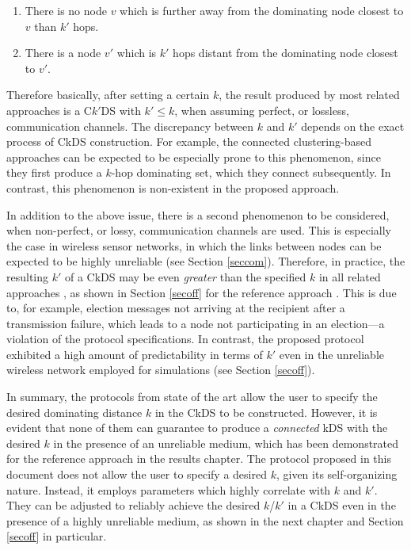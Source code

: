 \begin{enumerate}

\item There is no node $v$ which is further away from the dominating node closest to $v$ than $k'$ hops.

\item There is a node $v'$ which is $k'$ hops distant from the dominating node closest to $v'$. 

\end{enumerate}

 Therefore basically, after setting a certain $k$, the result produced by most related approaches is a C$k'$DS with $k'\leq k$, when assuming perfect, or lossless, communication channels. The discrepancy between $k$ and $k'$ depends on the exact process of CkDS construction. For example, the connected clustering-based approaches \cite{theoleyreV04structure, theoleyreV05stabilization, yangWC05clustering} can be expected to be especially prone to this phenomenon, since they first produce a $k$-hop dominating set, which they connect subsequently. In contrast, this phenomenon is non-existent in the proposed approach.
 

In addition to the above issue, there is a second phenomenon to be considered, when non-perfect, or lossy, communication channels are used. This is especially the case in wireless sensor networks, in which the links between nodes can be expected to be highly unreliable (see Section \ref{seccom}). Therefore, in practice, the resulting $k'$ of a CkDS may be even \emph{greater} than the specified $k$ in all related approaches \cite{sausenSLP07backbones, theoleyreV04structure, theoleyreV05stabilization, yangLT08algorithm, yangWC05clustering}, as shown in Section \ref{secoff} for the reference approach \cite{sausenSLP07backbones}. This is due to, for example, election messages not arriving at the recipient after a transmission failure, which leads to a node not participating in an election---a violation of the protocol specifications. In contrast, the proposed protocol exhibited a high amount of predictability in terms of $k'$ even in the unreliable wireless network employed for simulations (see Section \ref{secoff}).

In summary, the protocols from state of the art \cite{sausenSLP07backbones, theoleyreV04structure, theoleyreV05stabilization, yangLT08algorithm, yangWC05clustering} allow the user to specify the desired dominating distance $k$ in the CkDS to be constructed. However, it is evident that none of them can guarantee to produce a \emph{connected} kDS with the desired $k$ in the presence of an unreliable medium, which has been demonstrated for the reference approach \cite{sausenSLP07backbones} in the results chapter. The protocol proposed in this document does not allow the user to specify a desired $k$, given its self-organizing nature. Instead, it employs parameters which highly correlate with $k$ and $k'$. They can be adjusted to reliably achieve the desired $k$/$k'$ in a CkDS even in the presence of a highly unreliable medium, as shown in the next chapter and Section \ref{secoff} in particular.


